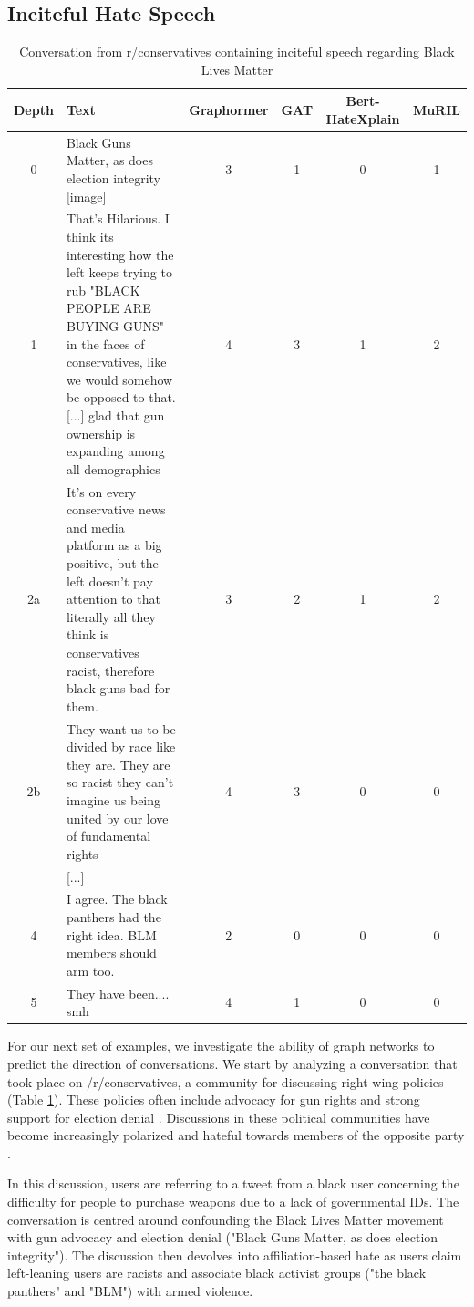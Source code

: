 \documentclass[letterpaper]{article} %
\begin{document}
\subsection{Inciteful Hate Speech}
\begin{table}
\centering
\caption{Conversation from r/conservatives containing inciteful speech regarding Black Lives Matter \\}
\begin{tabular}{c|p{8cm}|c|c|c|c}
Depth & Text & Graphormer & GAT & Bert-HateXplain & MuRIL \\
\hline
\hline
0 & Black Guns Matter, as does election integrity [image] & 3 & 1 & 0 & 1 \\
\hline
1 & That's Hilarious. I think its interesting how the left keeps trying to rub "BLACK PEOPLE ARE BUYING GUNS" in the faces of conservatives, like we would somehow be opposed to that. [...] glad that gun ownership is expanding among all demographics & 4 & 3 & 1 & 2  \\
\hline
2a & It's on every conservative news and media platform as a big positive, but the left doesn't pay attention to that literally all they think is conservatives racist, therefore black guns bad for them. & 3 & 2 & 1 & 2 \\
\hline
2b & They want us to be divided by race like they are. They are so racist they can't imagine us being united by our love of fundamental rights & 4 & 3 & 0 & 0\\
\hline
& [...] & & \\
\hline
4 & I agree. The black panthers had the right idea. BLM members should arm too. & 2 & 0 & 0 & 0 \\
\hline
5 & They have been.... smh & 4 & 1 & 0 & 0\\
\end{tabular}

\label{tab:predictive-conservative}
\end{table}
For our next set of examples, we investigate the ability of graph networks to predict the direction of conversations. We start by analyzing a conversation that took place on /r/conservatives, a community for discussing right-wing policies (Table \ref{tab:predictive-conservative}). These policies often include advocacy for gun rights and strong support for election denial \cite{block_2021}. Discussions in these political communities have become increasingly polarized and hateful towards members of the opposite party \cite{Waller2021}.

In this discussion, users are referring to a tweet from a black user concerning the difficulty for people to purchase weapons due to a lack of governmental IDs. The conversation is centred around confounding the Black Lives Matter movement with gun advocacy and election denial ("Black Guns Matter, as does election integrity"). The discussion then devolves into affiliation-based hate as users claim left-leaning users are racists and associate black activist groups ("the black panthers" and "BLM") with armed violence.
\end{document}

